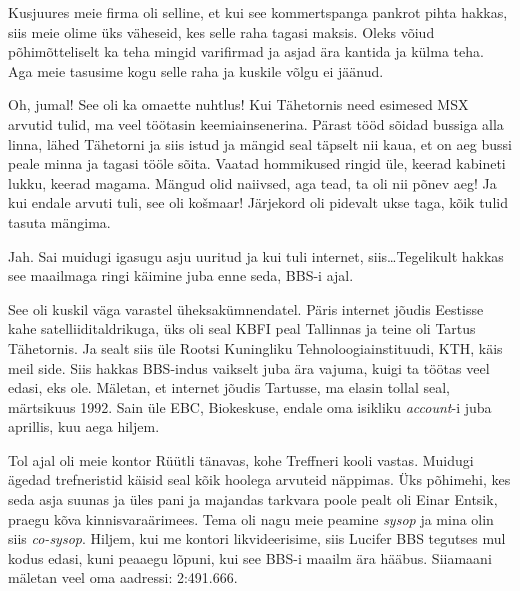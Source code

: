 Kusjuures meie firma oli selline, et kui see kommertspanga  pankrot pihta hakkas, siis meie olime üks väheseid, kes selle raha tagasi maksis. Oleks võiud põhimõtteliselt ka teha mingid varifirmad ja asjad ära kantida ja külma teha. Aga meie tasusime kogu selle raha ja kuskile võlgu ei jäänud.


Oh, jumal! See oli ka omaette nuhtlus! Kui Tähetornis need esimesed MSX arvutid tulid,   ma veel töötasin keemiainsenerina. Pärast tööd sõidad bussiga alla linna, lähed Tähetorni ja siis istud ja mängid seal täpselt nii kaua, et on aeg bussi peale minna ja tagasi tööle sõita. Vaatad hommikused ringid üle, keerad kabineti lukku, keerad magama. Mängud olid naiivsed, aga tead, ta  oli nii põnev aeg! Ja kui endale arvuti tuli, see oli košmaar! Järjekord oli pidevalt ukse taga, kõik tulid tasuta mängima. 

Jah. Sai muidugi igasugu asju uuritud ja kui tuli internet, siis\ldots Tegelikult hakkas see maailmaga ringi käimine juba enne seda, BBS-i ajal.
                 

See oli kuskil väga varastel üheksakümnendatel. Päris internet jõudis Eestisse kahe satelliiditaldrikuga, üks oli seal KBFI peal Tallinnas ja teine oli Tartus Tähetornis. Ja sealt siis üle Rootsi Kuningliku Tehnoloogiainstituudi, KTH,  käis meil side. Siis hakkas BBS-indus vaikselt juba ära vajuma, kuigi ta  töötas veel edasi, eks ole. Mäletan, et internet jõudis Tartusse,  ma elasin tollal  seal, märtsikuus 1992. Sain üle  EBC, Biokeskuse, endale oma isikliku \emph{account}-i juba aprillis, kuu aega hiljem.
                 
Tol ajal oli meie kontor Rüütli tänavas, kohe Treffneri kooli vastas. Muidugi ägedad trefneristid  käisid seal kõik hoolega arvuteid näppimas. Üks põhimehi, kes seda asja suunas ja üles pani ja majandas tarkvara poole pealt oli Einar Entsik, praegu kõva kinnisvaraärimees. Tema oli nagu meie peamine \emph{sysop} ja mina olin siis \emph{co-sysop}. Hiljem, kui me kontori likvideerisime, siis Lucifer BBS tegutses mul kodus edasi, kuni peaaegu lõpuni, kui see BBS-i maailm ära hääbus. Siiamaani mäletan veel oma aadressi: 2:491.666.
           
